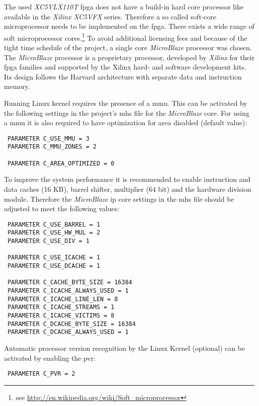 The used \textit{XC5VLX110T} \gls{fpga} does not have a build-in hard core processor like available in the \textit{Xilinx XC5VFX} series. Therefore a so called soft-core microprocessor needs to be implemented on the \gls{fpga}. There exists a wide range of soft microprocessor cores.\footnote{see \url{http://en.wikipedia.org/wiki/Soft_microprocessor}} To avoid additional licensing fees and because of the tight time schedule of the project, a single core \textit{MicroBlaze} processor was chosen. The \textit{MicroBlaze} processor is a proprietary processor, developed by \textit{Xilinx} for their \gls{fpga} families and supported by the Xilinx hard- and software development kits. Its design follows the Harvard architecture with separate data and instruction memory.

Running Linux kernel requires the presence of a \gls{mmu}. This can be activated by the following settings in the project's \gls{mhs} file for the \textit{MicroBlaze} core. For using a \gls{mmu} it is also required to have optimization for area disabled (default value):

\begin{verbatim}
 PARAMETER C_USE_MMU = 3
 PARAMETER C_MMU_ZONES = 2
 
 PARAMETER C_AREA_OPTIMIZED = 0
\end{verbatim}

To improve the system performance it is recommended to enable instruction and data caches (16 KB), barrel shifter, multiplier (64 bit) and the hardware division module. Therefore the \textit{MicroBlaze} \gls{ip} core settings in the \gls{mhs} file should be adjusted to meet the following values:

\begin{verbatim}
 PARAMETER C_USE_BARREL = 1
 PARAMETER C_USE_HW_MUL = 2
 PARAMETER C_USE_DIV = 1

 PARAMETER C_USE_ICACHE = 1
 PARAMETER C_USE_DCACHE = 1

 PARAMETER C_CACHE_BYTE_SIZE = 16384
 PARAMETER C_ICACHE_ALWAYS_USED = 1
 PARAMETER C_ICACHE_LINE_LEN = 8
 PARAMETER C_ICACHE_STREAMS = 1
 PARAMETER C_ICACHE_VICTIMS = 8
 PARAMETER C_DCACHE_BYTE_SIZE = 16384
 PARAMETER C_DCACHE_ALWAYS_USED = 1
\end{verbatim}

Automatic processor version recognition by the Linux Kernel (optional) can be activated by enabling the \gls{pvr}:

\begin{verbatim}
 PARAMETER C_PVR = 2
\end{verbatim}

